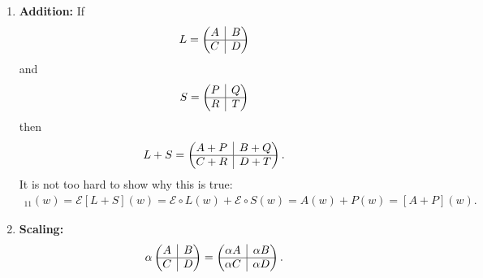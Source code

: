 \documentclass{book}
\theoremstyle{definition}
\newcommand{\E}{\mathcal{E}}
\newcommand{\rvline}{\hspace*{-\arraycolsep}\vline\hspace*{-\arraycolsep}}
\begin{document}
\begin{enumerate}
	\item \textbf{Addition:} If 
	\begin{align*}
	L = \begin{pmatrix}
	A & \rvline & B\\
	\hline
	C & \rvline & D
	\end{pmatrix}
	\end{align*}
	and
	\begin{align*}
	S = \begin{pmatrix}
	P & \rvline & Q\\
	\hline
	R & \rvline & T
	\end{pmatrix}
	\end{align*}
	then
	\begin{align*}
	L + S = \begin{pmatrix}
	A + P & \rvline & B+Q\\
	\hline
	C + R & \rvline & D + T
	\end{pmatrix}.
	\end{align*}
	It is not too hard to show why this is true:
	\begin{align*}
	[L+S]_{11}(w) = \E [L+S](w) = \E \circ L(w) + \E\circ S(w) = A(w) + P(w) = [A+P](w).
	\end{align*}
	
	
	
	\item \textbf{Scaling:}
	\begin{align*}
	\alpha \begin{pmatrix}
	A & \rvline & B\\
	\hline
	C & \rvline & D
	\end{pmatrix} = \begin{pmatrix}
	\alpha A & \rvline & \alpha B\\
	\hline
	\alpha C & \rvline & \alpha D
	\end{pmatrix}.
	\end{align*}
	

\end{enumerate}
\end{document}
